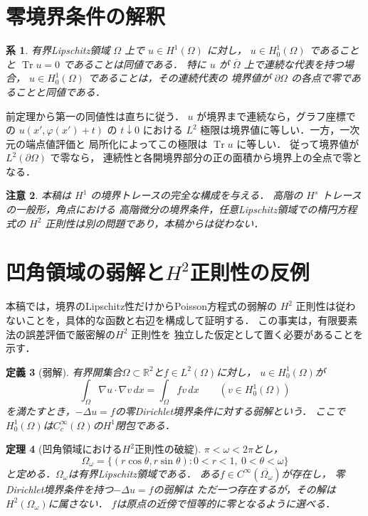 \documentclass[a5paper,10pt,onecolumn]{jsarticle}
\makeatletter
\theoremstyle{mathnotetheorem}
\newtheorem{theorem}{定理}[section]
\newtheorem{definition}[theorem]{定義}
\newtheorem{corollary}[theorem]{系}
\newtheorem{remark}[theorem]{注意}
\renewcommand{\proofname}{証明}
\renewenvironment{proof}[1][\proofname]{%
  \par\pushQED{\qed}\normalfont\topsep4\p@\@plus2\p@\relax
  \trivlist\item[\hskip\labelsep\bfseries #1]\ignorespaces
}{\popQED\endtrivlist\@endpefalse}
\makeatother
\begin{document}
\section{零境界条件の解釈}
\begin{corollary}
有界Lipschitz領域 $\Omega$ 上で $u\in H^1(\Omega)$ に対し，
$u\in H_0^1(\Omega)$ であることと
$\operatorname{Tr}u=0$ であることは同値である．
特に $u$ が $\overline\Omega$ 上で連続な代表を持つ場合，
$u\in H_0^1(\Omega)$ であることは，その連続代表の
境界値が $\partial\Omega$ の各点で零であることと同値である．
\end{corollary}
\begin{proof}
前定理から第一の同値性は直ちに従う．
$u$ が境界まで連続なら，グラフ座標での
$u(x',\varphi(x')+t)$ の $t\downarrow0$ における
$L^2$ 極限は境界値に等しい．一方，一次元の端点値評価と
局所化によってこの極限は $\operatorname{Tr}u$ に等しい．
従って境界値が $L^2(\partial\Omega)$ で零なら，
連続性と各開境界部分の正の面積から境界上の全点で零となる．
\end{proof}

\begin{remark}
本稿は $H^1$ の境界トレースの完全な構成を与える．
高階の $H^s$ トレースの一般形，角点における
高階微分の境界条件，任意Lipschitz領域での楕円方程式の
$H^2$ 正則性は別の問題であり，本稿からは従わない．
\end{remark}


\section{凹角領域の弱解と\texorpdfstring{$H^2$}{H2}正則性の反例}
本稿では，境界のLipschitz性だけからPoisson方程式の弱解の
$H^2$ 正則性は従わないことを，具体的な函数と右辺を構成して証明する．
この事実は，有限要素法の誤差評価で厳密解の$H^2$ 正則性を
独立した仮定として置く必要があることを示す．

\begin{definition}[弱解]
有界開集合$\Omega\subset\mathbb R^2$と$f\in L^2(\Omega)$に対し，
$u\in H_0^1(\Omega)$が
\[
 \int_\Omega\nabla u\cdot\nabla v\,dx
   =\int_\Omega fv\,dx
 \qquad(v\in H_0^1(\Omega))
\]
を満たすとき，$-\Delta u=f$の零Dirichlet境界条件に対する弱解という．
ここで$H_0^1(\Omega)$は$C_c^\infty(\Omega)$の$H^1$閉包である．
\end{definition}

\begin{theorem}[凹角領域における$H^2$正則性の破綻]\label{corner:thm:corner}
$\pi<\omega<2\pi$とし，
\[
 \Omega_\omega=
 \{(r\cos\theta,r\sin\theta):0<r<1,\ 0<\theta<\omega\}
\]
と定める．$\Omega_\omega$は有界Lipschitz領域である．
ある$f\in C^\infty(\overline{\Omega_\omega})$が存在し，
零Dirichlet境界条件を持つ$-\Delta u=f$の弱解は
ただ一つ存在するが，その解は$H^2(\Omega_\omega)$に属さない．
$f$は原点の近傍で恒等的に零となるように選べる．
\end{theorem}
\end{document}
